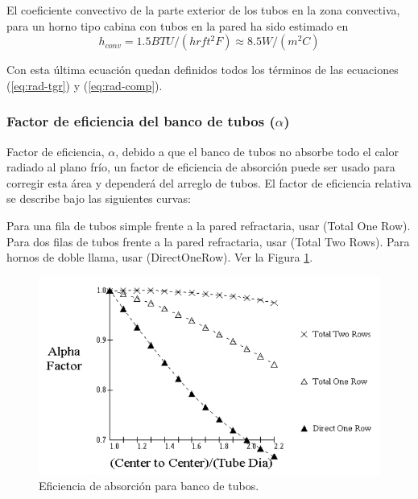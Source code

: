 \par El coeficiente convectivo de la parte exterior de los tubos en la zona convectiva, para un horno tipo cabina con tubos en la pared ha sido estimado en
\begin{equation}
h_{conv} = 1.5  BTU/(hr ft^2 F) \approx 8.5 W/(m^2 C)
\end{equation}

Con esta última ecuación quedan definidos todos los términos de las ecuaciones (\ref{eq:rad-tgr}) y (\ref{eq:rad-comp}).

\subsubsection{Factor de eficiencia del banco de tubos ($\alpha$)}

Factor de eficiencia, $\alpha$, debido a que el banco de tubos no absorbe todo el calor radiado al plano frío, un factor de eficiencia de absorción puede ser usado para corregir esta área y dependerá del arreglo de tubos. El factor de eficiencia relativa se describe bajo las siguientes curvas:
\par Para una fila de tubos simple frente a la pared refractaria, usar (Total One Row). Para dos filas de tubos frente a la pared refractaria, usar (Total Two Rows). Para hornos de doble llama, usar (DirectOneRow). Ver la Figura \ref{fig:alpha}.

\begin{figure}[hbt]
\begin{center}
\includegraphics[scale=0.45]{images/alpha}
\caption[Eficiencia de absorción para banco de tubos]{Eficiencia de absorción para banco de tubos.}
\label{fig:alpha}
\end{center}
\end{figure}

